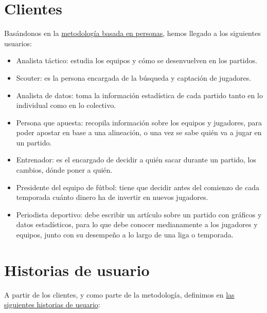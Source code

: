 \section{Clientes}
Basándonos en la \href{https://www.designthinking.services/herramientas-design-thinking/metodo-persona/}{metodología basada en personas}, 
hemos llegado a los siguientes usuarios: 
\begin{itemize}
    \item Analista táctico: estudia los equipos y cómo se desenvuelven en los partidos. 
    \item Scouter: es la persona encargada de la búsqueda y captación 
    de jugadores.
    \item Analista de datos: toma la información estadística de 
    cada partido tanto en lo individual como en lo colectivo. 
    \item Persona que apuesta: recopila información sobre los equipos y jugadores, para poder apostar 
    en base a una alineación, o una vez se sabe quién va a jugar en un partido. 
    \item Entrenador: es el encargado de decidir a quién sacar durante un partido, los 
    cambios, dónde poner a quién. 
    \item Presidente del equipo de fútbol: tiene que decidir antes del comienzo 
    de cada temporada cuánto dinero ha de invertir en nuevos jugadores. 
    \item Periodista deportivo: debe escribir un artículo sobre un partido con gráficos y datos estadísticos, 
    para lo que debe conocer medianamente a los jugadores y equipos, junto con su desempeño a lo largo de 
    una liga o temporada. 
\end{itemize}

\section{Historias de usuario}  

A partir de los clientes, y como parte de la metodología, definimos en \href{https://github.com/ElenaMerelo/TFG/issues?q=is%3Aopen+is%3Aissue+label%3Auser-story}{las siguientes historias de usuario}: 


